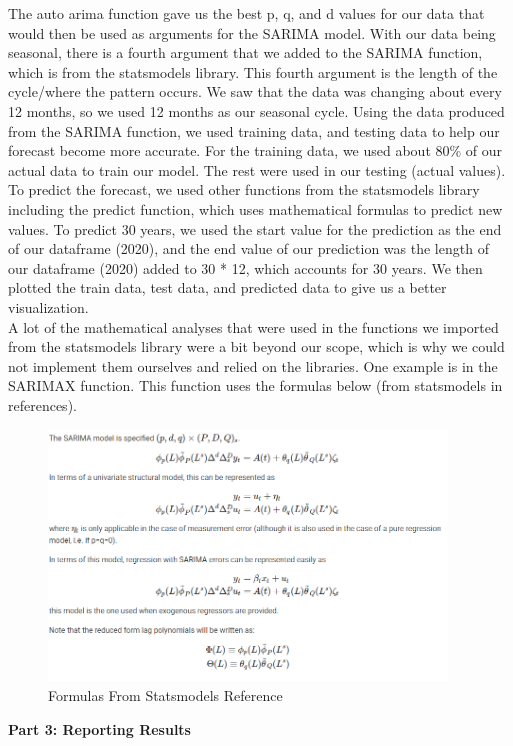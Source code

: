 \documentclass[fontsize=11pt]{article}
\begin{document}
    The auto arima function gave us the best p, q, and d values for our data that would then be used as arguments for the SARIMA model. With our data being seasonal, there is a fourth argument that we added to the SARIMA function, which is from the statsmodels library. This fourth argument is the length of the cycle/where the pattern occurs. We saw that the data was changing about every 12 months, so we used 12 months as our seasonal cycle. Using the data produced from the SARIMA function, we used training data, and testing data to help our forecast become more accurate. For the training data, we used about 80\% of our actual data to train our model. The rest were used in our testing (actual values). To predict the forecast, we used other functions from the statsmodels library including the predict function, which uses mathematical formulas to predict new values. To predict 30 years, we used the start value for the prediction as the end of our dataframe (2020), and the end value of our prediction was the length of our dataframe (2020) added to 30 * 12, which accounts for 30 years. We then plotted the train data, test data, and predicted data to give us a better visualization. \\

    A lot of the mathematical analyses that were used in the functions we imported from the statsmodels library were a bit beyond our scope, which is why we could not implement them ourselves and relied on the libraries. One example is in the SARIMAX function. This function uses the formulas below (from statsmodels in references).

    \begin{figure}[h]
        \centering
        \includegraphics[width=300pt]{sarima_equations.png}
        \caption{Formulas From Statsmodels Reference}
    \end{figure}

    \textbf{Part 3: Reporting Results}
\end{document}
